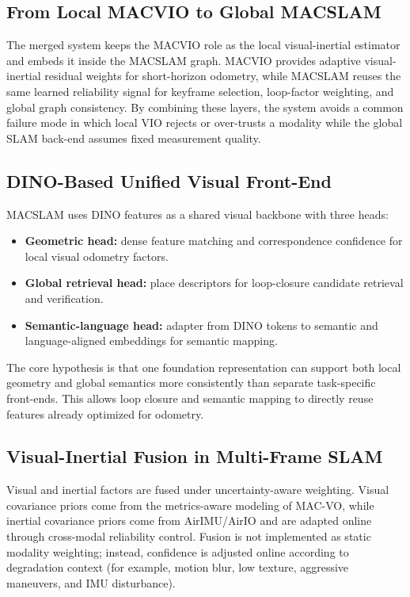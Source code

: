 \subsection{From Local MACVIO to Global MACSLAM}

The merged system keeps the MACVIO role as the local visual-inertial estimator and embeds it inside the MACSLAM graph.
MACVIO provides adaptive visual-inertial residual weights for short-horizon odometry, while MACSLAM reuses the same learned reliability signal for keyframe selection, loop-factor weighting, and global graph consistency.
By combining these layers, the system avoids a common failure mode in which local VIO rejects or over-trusts a modality while the global SLAM back-end assumes fixed measurement quality.

\subsection{DINO-Based Unified Visual Front-End}

MACSLAM uses DINO features as a shared visual backbone with three heads:
\begin{itemize}
    \item \textbf{Geometric head:} dense feature matching and correspondence confidence for local visual odometry factors.
    \item \textbf{Global retrieval head:} place descriptors for loop-closure candidate retrieval and verification.
    \item \textbf{Semantic-language head:} adapter from DINO tokens to semantic and language-aligned embeddings for semantic mapping.
\end{itemize}

The core hypothesis is that one foundation representation can support both local geometry and global semantics more consistently than separate task-specific front-ends.
This allows loop closure and semantic mapping to directly reuse features already optimized for odometry.

\subsection{Visual-Inertial Fusion in Multi-Frame SLAM}

Visual and inertial factors are fused under uncertainty-aware weighting.
Visual covariance priors come from the metrics-aware modeling of MAC-VO, while inertial covariance priors come from AirIMU/AirIO and are adapted online through cross-modal reliability control.
Fusion is not implemented as static modality weighting; instead, confidence is adjusted online according to degradation context (for example, motion blur, low texture, aggressive maneuvers, and IMU disturbance).

